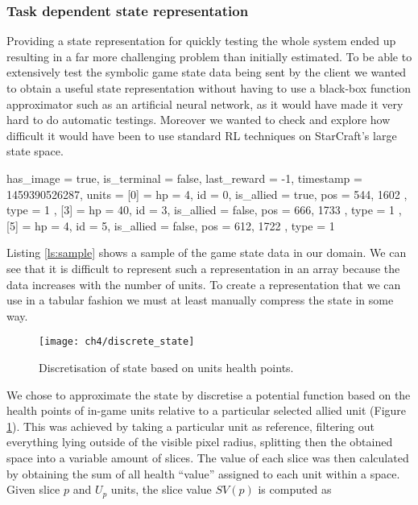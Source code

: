\subsubsection{Task dependent state representation}

Providing a state representation for quickly testing the whole system ended up
resulting in a far more challenging problem than initially estimated. To be able
to extensively test the symbolic game state data being sent by the client we
wanted to obtain a useful state representation without having to use a black-box
function approximator such as an artificial neural network, as it would have
made it very hard to do automatic testings. Moreover we wanted to check and
explore how difficult it would have been to use standard RL techniques on
StarCraft's large state space.

\begin{sflisting}[caption=Example of a game state Lua table recorded by the
  agent, label=ls:sample] [standard]
{
  has_image = true,
  is_terminal = false,
  last_reward = -1,
  timestamp = 1459390526287,
  units = {
    [0] = {
      hp = 4,
      id = 0,
      is_allied = true,
      pos = { 544, 1602 },
      type = 1
    },
    [3] = {
      hp = 40,
      id = 3,
      is_allied = false,
      pos = { 666, 1733 },
      type = 1
    },
    [5] = {
      hp = 4,
      id = 5,
      is_allied = false,
      pos = { 612, 1722 },
      type = 1
    }
  }
}

\end{sflisting}

Listing \ref{ls:sample} shows a sample of the game state data in our
domain. We can see that it is difficult to represent such a representation in an
array because the data increases with the number of units. To create a
representation that we can use in a tabular fashion we must at least manually
compress the state in some way.

\begin{figure}[h]
    \centering
    \texttt{[image: ch4/discrete\_state]}
    \caption{Discretisation of state based on units health points.}
    \label{fig:discrete_state}
\end{figure}

We chose to approximate the state by discretise a potential function
\citep{thrun2005probabilistic} based on the health points of in-game units
relative to a particular selected allied unit (Figure \ref{fig:discrete_state}).
This was achieved by taking a particular unit as reference, filtering out
everything lying outside of the visible pixel radius, splitting then the
obtained space into a variable amount of slices. The value of each slice was
then calculated by obtaining the sum of all health ``value'' assigned to each
unit within a space. Given slice $p$ and $U_p$ units, the slice value $SV(p)$ is
computed as

